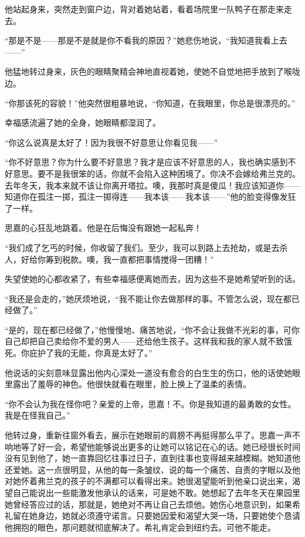 \par 他站起身来，突然走到窗户边，背对着她站着，看着场院里一队鸭子在那走来走去。
\par “那是不是——那是不是就是你不看我的原因？”她悲伤地说，“我知道我看上去——”
\par 他猛地转过身来，灰色的眼睛聚精会神地直视着她，使她不自觉地把手放到了喉咙边。
\par “你那该死的容貌！”他突然很粗暴地说，“你知道，在我眼里，你总是很漂亮的。”
\par 幸福感流遍了她的全身，她眼睛都湿润了。
\par “你这么说真是太好了！因为我很不好意思让你看见我——”
\par “你不好意思？你为什么要不好意思？我才是应该不好意思的人，我也确实感到不好意思。要不是我很笨的话，你就不会陷入这种困境了。你决不会嫁给弗兰克的。去年冬天，我本来就不该让你离开塔拉。噢，我那时真是傻瓜！我应该知道你——知道你在孤注一掷，孤注一掷得连——我本该——我本该——”他的脸变得像发狂了一样。
\par 思嘉的心狂乱地跳着。他是在后悔没有跟她一起私奔！
\par “我们成了乞丐的时候，你收留了我们。至少，我可以到路上去抢劫，或是去杀人，好给你筹到税款。噢，我一直都把事情搅得一团糟！”
\par 失望使她的心都收紧了，有些幸福感便离她而去，因为这些不是她希望听到的话。
\par “我还是会走的，”她厌烦地说，“我不能让你去做那样的事。不管怎么说，现在都已经做了。”
\par “是的，现在都已经做了，”他慢慢地、痛苦地说，“你不会让我做不光彩的事，可你自己却把自己卖给你不爱的男人——还给他生孩子。这样我和我的家人就不致饿死。你庇护了我的无能，你真是太好了。”
\par 他说话的尖刻意味显露出他内心深处一道没有愈合的白生生的伤口，他的话使她眼里露出了羞辱的神色。他很快就看在眼里，脸上换上了温柔的表情。
\par “你不会认为我在怪你吧？亲爱的上帝，思嘉！不。你是我知道的最勇敢的女性。我是在怪我自己。”
\par 他转过身，重新往窗外看去，展示在她眼前的肩膀不再挺得那么平了。思嘉一声不响地等了好一会，希望他能够说出更多的让她可以铭记在心的话。她已经很长时间没有见到他了，她一直靠回忆往事过日子，直到往事也变得越来越模糊。她知道他还爱她。这一点很明显，从他的每一条皱纹、说的每一个痛苦、自责的字眼以及他对她怀着弗兰克的孩子的不满都可以看得出来。她很渴望能听到他亲口说出来，渴望自己能说出一些能激发他承认的话来，可是她不敢。她想起了去年冬天在果园里她曾经答应过的话，那就是，她绝对不再让自己去烦他。她伤心地意识到，如果希礼留在她身边，她就必须遵守诺言。只要她因爱和渴望大哭一场，只要她使个恳请他拥抱的眼色，那问题就彻底解决了。希礼肯定会到纽约去。可他不能走。

